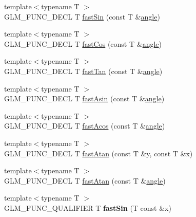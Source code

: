 \begin{DoxyCompactItemize}
\item 
{\footnotesize template$<$typename T $>$ }\\G\+L\+M\+\_\+\+F\+U\+N\+C\+\_\+\+D\+E\+CL T \hyperlink{group__gtx__fast__trigonometry_ga01b7dc431bf5f5e6acce7d6bba311f86}{fast\+Sin} (const T \&\hyperlink{group__gtc__quaternion_ga23a3fc7ada5bbb665ff84c92c6e0542c}{angle})
\item 
{\footnotesize template$<$typename T $>$ }\\G\+L\+M\+\_\+\+F\+U\+N\+C\+\_\+\+D\+E\+CL T \hyperlink{group__gtx__fast__trigonometry_gad54184beaba79e41db71a1f5711380c4}{fast\+Cos} (const T \&\hyperlink{group__gtc__quaternion_ga23a3fc7ada5bbb665ff84c92c6e0542c}{angle})
\item 
{\footnotesize template$<$typename T $>$ }\\G\+L\+M\+\_\+\+F\+U\+N\+C\+\_\+\+D\+E\+CL T \hyperlink{group__gtx__fast__trigonometry_gae6615cdb40d8dc58115a07a21f495561}{fast\+Tan} (const T \&\hyperlink{group__gtc__quaternion_ga23a3fc7ada5bbb665ff84c92c6e0542c}{angle})
\item 
{\footnotesize template$<$typename T $>$ }\\G\+L\+M\+\_\+\+F\+U\+N\+C\+\_\+\+D\+E\+CL T \hyperlink{group__gtx__fast__trigonometry_gab8595a77c5b215b95f662238dc3ff722}{fast\+Asin} (const T \&\hyperlink{group__gtc__quaternion_ga23a3fc7ada5bbb665ff84c92c6e0542c}{angle})
\item 
{\footnotesize template$<$typename T $>$ }\\G\+L\+M\+\_\+\+F\+U\+N\+C\+\_\+\+D\+E\+CL T \hyperlink{group__gtx__fast__trigonometry_ga44e6efc3e776a51645fdf998e3e4f11b}{fast\+Acos} (const T \&\hyperlink{group__gtc__quaternion_ga23a3fc7ada5bbb665ff84c92c6e0542c}{angle})
\item 
{\footnotesize template$<$typename T $>$ }\\G\+L\+M\+\_\+\+F\+U\+N\+C\+\_\+\+D\+E\+CL T \hyperlink{group__gtx__fast__trigonometry_gaf6234384b94846e29cf2c51dc245d484}{fast\+Atan} (const T \&y, const T \&x)
\item 
{\footnotesize template$<$typename T $>$ }\\G\+L\+M\+\_\+\+F\+U\+N\+C\+\_\+\+D\+E\+CL T \hyperlink{group__gtx__fast__trigonometry_ga49b3b2b777b83eeed3e11205e800027e}{fast\+Atan} (const T \&\hyperlink{group__gtc__quaternion_ga23a3fc7ada5bbb665ff84c92c6e0542c}{angle})
\item 
{\footnotesize template$<$typename T $>$ }\\G\+L\+M\+\_\+\+F\+U\+N\+C\+\_\+\+Q\+U\+A\+L\+I\+F\+I\+ER T {\bfseries fast\+Sin} (T const \&x)\hypertarget{namespaceglm_ad9b22c114ca88f3b9e2381657d121506}{}\label{namespaceglm_ad9b22c114ca88f3b9e2381657d121506}


\end{DoxyCompactItemize}
